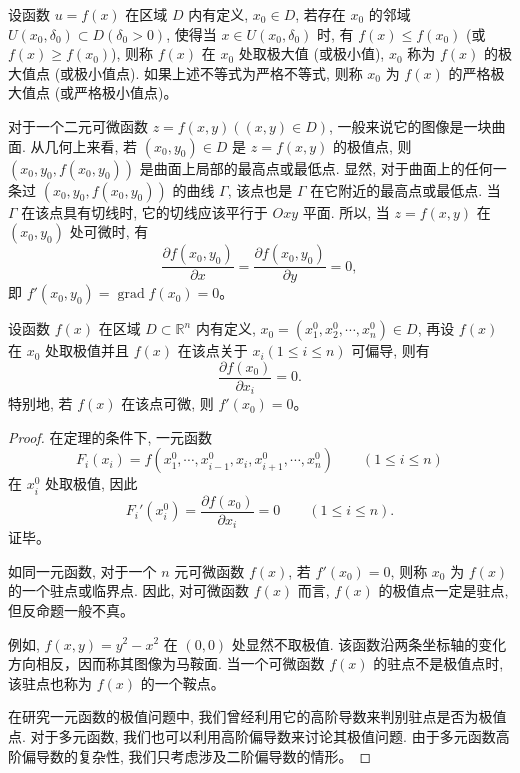 \documentclass[12pt,fontset=fandol]{ctexart}
\begin{document}
\begin{definition}\label{course-definition-14-5-1}\quad 设函数 $u=f(x)$ 在区域 $D$ 内有定义, $x_0\in D$, 若存在 $x_0$ 的邻域 $U(x_0,\delta_0)\subset D(\delta_0>0)$, 使得当 $x\in U(x_0,\delta_0)$ 时, 有 $f(x)\leqslant f(x_0)$ (或 $f(x)\geqslant f(x_0)$), 则称 $f(x)$ 在 $x_0$ 处取极大值 (或极小值), $x_0$ 称为 $f(x)$ 的极大值点 (或极小值点). 如果上述不等式为严格不等式, 则称 $x_0$ 为 $f(x)$ 的严格极大值点 (或严格极小值点)。

对于一个二元可微函数 $z=f(x,y)((x,y)\in D)$, 一般来说它的图像是一块曲面. 从几何上来看, 若 $(x_0,y_0)\in D$ 是 $z=f(x,y)$ 的极值点, 则 $(x_0,y_0,f(x_0,y_0))$ 是曲面上局部的最高点或最低点. 显然, 对于曲面上的任何一条过 $(x_0,y_0,f(x_0,y_0))$ 的曲线 $\Gamma$, 该点也是 $\Gamma$ 在它附近的最高点或最低点. 当 $\Gamma$ 在该点具有切线时, 它的切线应该平行于 $Oxy$ 平面. 所以, 当 $z=f(x,y)$ 在 $(x_0,y_0)$ 处可微时, 有
\[
  \frac{\partial f(x_0,y_0)}{\partial x}
  =
  \frac{\partial f(x_0,y_0)}{\partial y}
  =0,
\]
即 $f'(x_0,y_0)=\operatorname{grad} f(x_0)=0$。

\end{definition}
\begin{theorem}\label{course-theorem-14-5-1}\quad 设函数 $f(x)$ 在区域 $D\subset\mathbb R^n$ 内有定义, $x_0=(x_1^0,x_2^0,\cdots,x_n^0)\in D$, 再设 $f(x)$ 在 $x_0$ 处取极值并且 $f(x)$ 在该点关于 $x_i(1\leqslant i\leqslant n)$ 可偏导, 则有
\[
  \frac{\partial f(x_0)}{\partial x_i}=0.
\]
特别地, 若 $f(x)$ 在该点可微, 则 $f'(x_0)=0$。

\end{theorem}
\begin{proof}\quad 在定理的条件下, 一元函数
\[
  F_i(x_i)=f(x_1^0,\cdots,x_{i-1}^0,x_i,x_{i+1}^0,\cdots,x_n^0)
  \qquad (1\leqslant i\leqslant n)
\]
在 $x_i^0$ 处取极值, 因此
\[
  F_i'(x_i^0)=\frac{\partial f(x_0)}{\partial x_i}=0
  \qquad (1\leqslant i\leqslant n).
\]
证毕。

如同一元函数, 对于一个 $n$ 元可微函数 $f(x)$, 若 $f'(x_0)=0$, 则称 $x_0$ 为 $f(x)$ 的一个驻点或临界点. 因此, 对可微函数 $f(x)$ 而言, $f(x)$ 的极值点一定是驻点, 但反命题一般不真。

例如, $f(x,y)=y^2-x^2$ 在 $(0,0)$ 处显然不取极值. 该函数沿两条坐标轴的变化方向相反，因而称其图像为马鞍面. 当一个可微函数 $f(x)$ 的驻点不是极值点时, 该驻点也称为 $f(x)$ 的一个鞍点。

在研究一元函数的极值问题中, 我们曾经利用它的高阶导数来判别驻点是否为极值点. 对于多元函数, 我们也可以利用高阶偏导数来讨论其极值问题. 由于多元函数高阶偏导数的复杂性, 我们只考虑涉及二阶偏导数的情形。

\end{proof}
\end{document}

